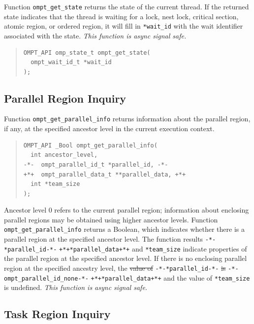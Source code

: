 \documentclass{article}
\providecommand{\DIFadd}[1]{{\protect\color{blue}\uwave{#1}}} %
\providecommand{\DIFdel}[1]{{\protect\color{red}\sout{#1}}}                      %
\providecommand{\DIFaddbegin}{} %
\providecommand{\DIFaddend}{} %
\providecommand{\DIFdelbegin}{} %
\providecommand{\DIFdelend}{} %
\begin{document}
Function \lstinline|ompt_get_state| returns the state of the 
current thread. If the returned state indicates that the thread is waiting for a lock, nest lock, critical section, atomic region, or ordered region, it will fill in \lstinline|*wait_id| with the wait identifier associated with the state.  {\em This function is async signal safe.}

\begin{quote}
\begin{lstlisting}
OMPT_API omp_state_t ompt_get_state(
  ompt_wait_id_t *wait_id       
);
\end{lstlisting}
\end{quote}

\subsection{Parallel Region Inquiry} 
\label{sec:parallel-inquiry} 
Function \lstinline|ompt_get_parallel_info| returns information about the parallel region, if any, at the specified ancestor level in the current execution context.

\begin{quote}
\begin{lstlisting}
OMPT_API _Bool ompt_get_parallel_info(
  int ancestor_level,
-*-  ompt_parallel_id_t *parallel_id, -*-
+*+  ompt_parallel_data_t **parallel_data, +*+
  int *team_size
);\end{lstlisting} \end{quote}

\noindent 
Ancestor level 0 refers to the current parallel region; 
information about enclosing parallel regions may be obtained using higher ancestor levels. 
Function \lstinline|ompt_get_parallel_info| returns a Boolean, which indicates whether there is a parallel region at the specified ancestor level.
The function results \DIFdelbegin \lstinline|-*-*parallel_id-*-| %
\DIFdelend \DIFaddbegin\lstinline|+*+*parallel_data+*+| \DIFaddend and \lstinline|*team_size| indicate properties of the parallel region at the specified ancestor level.
If there is no enclosing parallel region at the specified ancestry level, the \DIFdelbegin \DIFdel{value of }\lstinline|-*-*parallel_id-*-| %
\DIFdel{is }\lstinline|-*-ompt_parallel_id_none-*-| %
\DIFdelend \DIFaddbegin \DIFadd{address provided in }\lstinline|+*+*parallel_data+*+| \DIFadd{is NULL }\DIFaddend and the value of \lstinline|*team_size| is undefined.
{\em This function is async signal safe.}

\subsection{Task Region Inquiry}
\label{sec:task-region}
\end{document}
